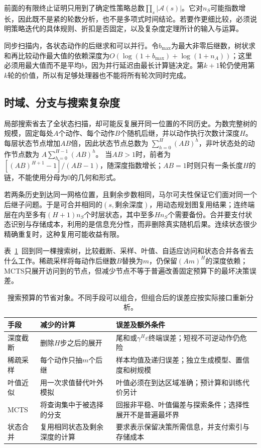 前面的有限终止证明只用到了确定性策略总数$\prod_s|\mathcal A(s)|$。它对$n_S$可能指数增长，因此既不是紧的轮数分析，也不是多项式时间结论。若要作更细比较，必须说明策略迭代的具体规则、折扣是否固定，以及复杂度定理所计的输入与运算。

同步扫描内，各状态动作的后继求和可以并行。令$b_{\max}$为最大非零后继数，树状求和再比较动作最大值的依赖深度为$O(\log(1+b_{\max})+\log(1+n_A))$；这里必须用最大值而不是平均$b$，因为并行延迟由最长计算链决定。第$k+1$轮仍使用第$k$轮的价值，所以有足够处理器也不能将所有轮次同时完成。

\subsection{时域、分支与搜索复杂度}
\label{sec:rl-planning-search-complexity}

局部搜索省去了全状态扫描，却可能反复展开同一位置的不同历史。为数完整树的规模，固定每处$A$个动作、每个动作$B$个随机后继，并以动作执行次数计深度$H$。每层状态节点增加$AB$倍，因此状态节点总数为
$\sum_{h=0}^{H}(AB)^h$，非叶状态处的动作节点数为
$A\sum_{h=0}^{H-1}(AB)^h$。
当$AB>1$时，前者为$[(AB)^{H+1}-1]/(AB-1)$，随深度指数增长；$AB=1$时则只有一条长度$H$的链，不能使用分母为0的几何和形式。

若两条历史到达同一网格位置，且剩余步数相同，马尔可夫性保证它们面对同一个后继子问题。于是可合并相同的$(s,\text{剩余深度})$，用动态规划图复用结果；连终端层在内至多有$(H+1)n_S$个时层状态，其中至多$Hn_S$个需要备份。合并要支付状态识别与存储成本，利用的是信息充分性，而非删除真实随机后果。连续状态很少精确重复时，这种复用可能收益有限。

表~\ref{tab:rl-planning-search-costs}~回到同一棵搜索树，比较截断、采样、叶值、自适应访问和状态合并各省去什么工作。稀疏采样将每动作后继数$B$替换为$m$，仍保留$(Am)^H$的深度依赖；MCTS只展开访问到的节点，但减少节点不等于普遍改善固定预算下的最坏决策误差。

\begin{table}[htbp]
 \centering
 \small
 \begin{tabularx}{\linewidth}{@{}l>{\raggedright\arraybackslash}X>{\raggedright\arraybackslash}X@{}}
  \toprule
  手段 & 减少的计算 & 误差及额外条件\\
  \midrule
  深度截断 & 删除$H$步之后的展开 & 尾和或$\gamma^H\varepsilon$终端误差；短视不可逆动作仍危险\\
  稀疏采样 & 每个动作只抽$m$个后继 & 样本均值及递归误差；独立生成模型、置信度和树规模\\
  叶值近似 & 用一次求值替代叶外模拟 & 叶值必须在到达区域准确；预计算和训练代价另计\\
  MCTS & 将查询集中于被选择的分支 & 回报非平稳、叶值偏差与探索条件；选择性展开不是普遍最坏界\\
  状态合并 & 复用相同状态及剩余深度的计算 & 要求表示保留决策所需信息，并支付索引与存储成本\\
  \bottomrule
 \end{tabularx}
 \caption{搜索预算的节省对象。不同手段可以组合，但组合后的误差应按实际接口重新分析。}
 \label{tab:rl-planning-search-costs}
\end{table}


